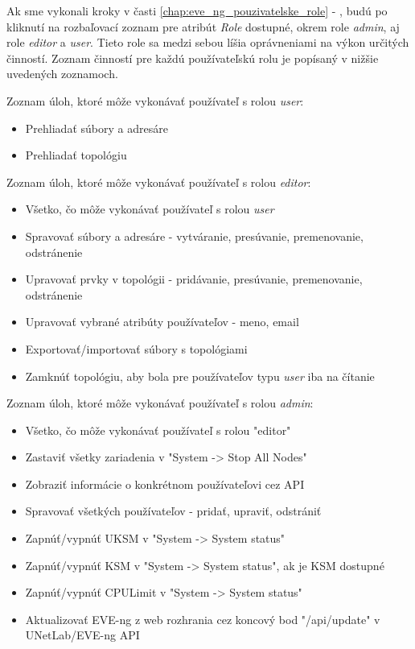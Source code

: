 Ak sme vykonali kroky v časti \ref{chap:eve_ng_pouzivatelske_role} - , budú po kliknutí na rozbaľovací zoznam pre atribút \emph{Role} dostupné, okrem role \emph{admin}, aj role \emph{editor} a \emph{user}. Tieto role sa medzi sebou líšia oprávneniami na výkon určitých činností. Zoznam činností pre každú používateľskú rolu je popísaný v nižšie uvedených zoznamoch.

\noindent
Zoznam úloh, ktoré môže vykonávať používateľ s rolou \emph{user}:

\begin{itemize}[noitemsep]
    \item Prehliadať súbory a adresáre
    \item Prehliadať topológiu
\end{itemize}

\noindent
Zoznam úloh, ktoré môže vykonávať používateľ s rolou \emph{editor}:

\begin{itemize}[noitemsep]
    \item Všetko, čo môže vykonávať používateľ s rolou \emph{user}
    \item Spravovať súbory a adresáre - vytváranie, presúvanie, premenovanie, odstránenie
    \item Upravovať prvky v topológii - pridávanie, presúvanie, premenovanie, odstránenie
    \item Upravovať vybrané atribúty používateľov - meno, email
    \item Exportovať/importovať súbory s topológiami
    \item Zamknúť topológiu, aby bola pre používateľov typu \emph{user} iba na čítanie
\end{itemize}

\noindent
Zoznam úloh, ktoré môže vykonávať používateľ s rolou \emph{admin}:

\begin{itemize}[noitemsep]
    \item Všetko, čo môže vykonávať používateľ s rolou "editor"
    \item Zastaviť všetky zariadenia v "System -> Stop All Nodes"
    \item Zobraziť informácie o konkrétnom používateľovi cez API
    \item Spravovať všetkých používateľov - pridať, upraviť, odstrániť
    \item Zapnúť/vypnúť UKSM v "System -> System status"
    \item Zapnúť/vypnúť KSM v "System -> System status", ak je KSM dostupné
    \item Zapnúť/vypnúť CPULimit v "System -> System status"
    \item Aktualizovať EVE-ng z web rozhrania cez koncový bod "/api/update" v UNetLab/EVE-ng API
\end{itemize}

